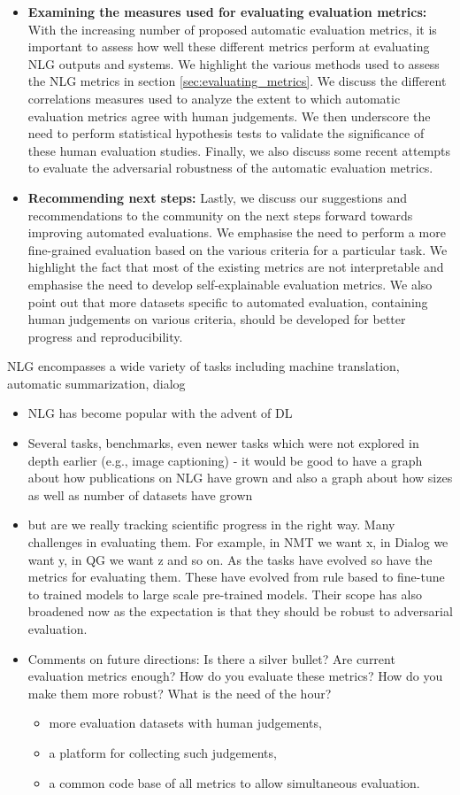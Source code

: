 \begin{itemize}
    \item \textbf{Examining the measures used for evaluating evaluation metrics:}
    With the increasing number of proposed automatic evaluation metrics, it is important to assess how well these different metrics perform at evaluating NLG outputs and systems. We highlight the various methods used to assess the NLG metrics in section \ref{sec:evaluating_metrics}. We discuss the different correlations measures used to analyze the extent to which automatic evaluation metrics agree with human judgements. We then underscore the need to perform statistical hypothesis tests to validate the significance of these human evaluation studies. Finally, we also discuss some recent attempts to evaluate the adversarial robustness of the automatic evaluation metrics. 
    \item \textbf{Recommending next steps:} Lastly, we discuss our suggestions and recommendations to the community on the next steps forward towards improving automated evaluations. We emphasise the need to perform a more fine-grained evaluation based on the various criteria for a particular task. We highlight the fact that most of the existing metrics are not interpretable and emphasise the need to develop self-explainable evaluation metrics. We also point out that more datasets specific to automated evaluation, containing human judgements on various criteria, should be developed for better progress and reproducibility. 
\end{itemize}
NLG encompasses a wide variety of tasks including machine translation, automatic summarization, dialog
\begin{itemize}
    \item NLG has become popular with the advent of DL
    \item Several tasks, benchmarks, even newer tasks which were not explored in depth earlier (e.g., image captioning) - it would be good to have a graph about how publications on NLG have grown and also a graph about how sizes as well as number of datasets have grown
    \item but are we really tracking scientific progress in the right way. Many challenges in evaluating them. For example, in NMT we want x, in Dialog we want y, in QG we want z and so on. As the tasks have evolved so have the metrics for evaluating them.  These have evolved from rule based to fine-tune to trained models to large scale pre-trained models. Their scope has also broadened now as the expectation is that they should be robust to adversarial evaluation. 
    \item Comments on future directions: Is there a silver bullet? Are current evaluation metrics enough? How do you evaluate these metrics? How do you make them more robust? What is the need of the hour? 
    \begin{itemize}
        \item more evaluation datasets with human judgements, 
        \item a platform for collecting such judgements, 
        \item a common code base of all metrics to allow simultaneous evaluation.
    \end{itemize}
\end{itemize}
